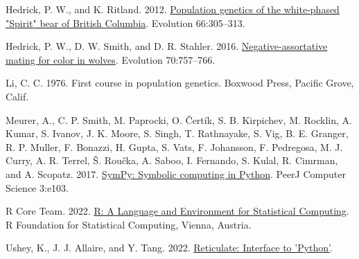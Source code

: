 \documentclass[
]{article}
\newlength{\cslhangindent}
\newlength{\cslentryspacingunit} %
\newenvironment{CSLReferences}[2] %
 {%
  \setlength{\parindent}{0pt}
  \ifodd #1
  \let\oldpar\par
  \def\par{\hangindent=\cslhangindent\oldpar}
  \fi
  \setlength{\parskip}{#2\cslentryspacingunit}
 }%
 {}
\begin{document}
\hypertarget{refs}{}
\begin{CSLReferences}{1}{0}
\leavevmode{}%
Hedrick, P. W., and K. Ritland. 2012. \href{https://doi.org/10.1111/j.1558-5646.2011.01463.x}{Population genetics of the white-phased "{Spirit}" bear of {British} {Columbia}}. Evolution 66:305--313.

\leavevmode{}%
Hedrick, P. W., D. W. Smith, and D. R. Stahler. 2016. \href{https://doi.org/10.1111/evo.12906}{Negative-assortative mating for color in wolves}. Evolution 70:757--766.

\leavevmode{}%
Li, C. C. 1976. First course in population genetics. Boxwood Press, Pacific Grove, Calif.

\leavevmode{}%
Meurer, A., C. P. Smith, M. Paprocki, O. Čertík, S. B. Kirpichev, M. Rocklin, A. Kumar, S. Ivanov, J. K. Moore, S. Singh, T. Rathnayake, S. Vig, B. E. Granger, R. P. Muller, F. Bonazzi, H. Gupta, S. Vats, F. Johansson, F. Pedregosa, M. J. Curry, A. R. Terrel, Š. Roučka, A. Saboo, I. Fernando, S. Kulal, R. Cimrman, and A. Scopatz. 2017. \href{https://doi.org/10.7717/peerj-cs.103}{{SymPy}: Symbolic computing in {Python}}. PeerJ Computer Science 3:e103.

\leavevmode{}%
R Core Team. 2022. \href{http://www.R-project.org/}{R: {A} {Language} and {Environment} for {Statistical} {Computing}}. R Foundation for Statistical Computing, Vienna, Austria.

\leavevmode{}%
Ushey, K., J. J. Allaire, and Y. Tang. 2022. \href{https://CRAN.R-project.org/package=reticulate}{Reticulate: {Interface} to '{Python}'}.

\end{CSLReferences}
\end{document}
